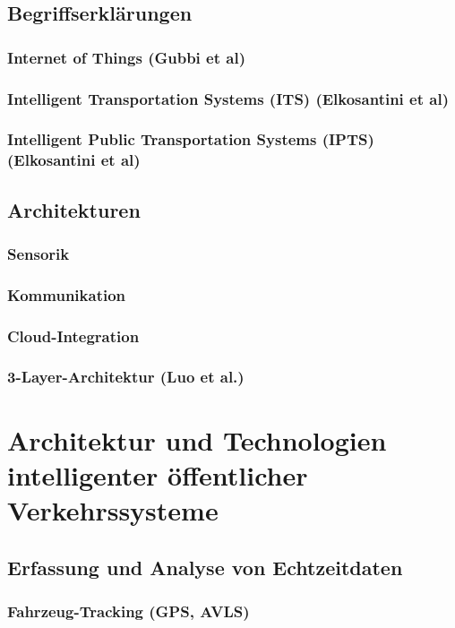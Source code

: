 \documentclass[ngerman]{seminarbeitrag} %
\begin{document}
\subsection{Begriffserklärungen}
\subsubsection{Internet of Things (Gubbi et al)}
\subsubsection{Intelligent Transportation Systems (ITS) (Elkosantini et al)}
\subsubsection{Intelligent Public Transportation Systems (IPTS) (Elkosantini et al)}
\subsection{Architekturen}
\subsubsection{Sensorik}
\subsubsection{Kommunikation}
\subsubsection{Cloud-Integration}
\subsubsection{3-Layer-Architektur (Luo et al.)}

\pagebreak
\section{Architektur und Technologien intelligenter öffentlicher Verkehrssysteme}
\subsection{Erfassung und Analyse von Echtzeitdaten}
\subsubsection{Fahrzeug-Tracking (GPS, AVLS)} 
\end{document}
